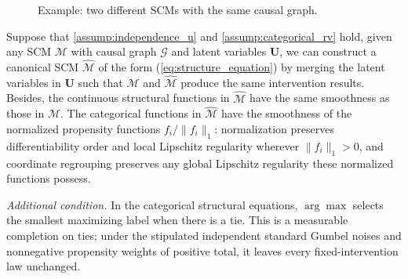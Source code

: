 \begin{figure}[!htb]
    \caption{Example: two different SCMs with the same causal graph. }
    \label{fig:example}
  \end{figure}
\begin{proposition}\label{prop:equivalent_g_constrianed}
    Suppose that \cref{assump:independence_u} and \cref{assump:categorical_rv} hold, given any SCM $\mathcal{M} $ with causal graph $\mathcal{G}$ and latent variables $\boldsymbol{U}$, we can construct a canonical SCM $\hat{\mathcal{M}}$ of the form (\ref{eq:structure_equation}) by merging the latent variables in $\boldsymbol{U}$ such that $\mathcal{M}$ and $\hat{\mathcal{M}}$ produce the same intervention results. Besides, the continuous structural functions in $\hat{\mathcal M}$ have the same smoothness as those in $\mathcal M$. The categorical functions in $\hat{\mathcal M}$ have the smoothness of the normalized propensity functions $f_i/\|f_i\|_1$: normalization preserves differentiability order and local Lipschitz regularity wherever $\|f_i\|_1>0$, and coordinate regrouping preserves any global Lipschitz regularity these normalized functions possess.

\emph{Additional condition.} In the categorical structural equations, $\arg\max$ selects the smallest maximizing label when there is a tie. This is a measurable completion on ties; under the stipulated independent standard Gumbel noises and nonnegative propensity weights of positive total, it leaves every fixed-intervention law unchanged.
\end{proposition}


